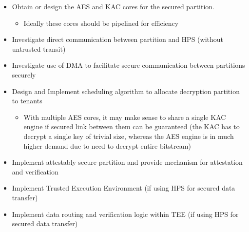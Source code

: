 \begin{itemize}
  \item Obtain or design the AES and KAC cores for the secured partition.
    \begin{itemize}  
      \item Ideally these cores should be pipelined for efficiency
    \end{itemize}
  \item Investigate direct communication between partition and HPS (without untrusted transit)
  \item Investigate use of DMA to facilitate secure communication between partitions securely
  \item Design and Implement scheduling algorithm to allocate decryption partition to tenants
    \begin{itemize}
      \item With multiple AES cores, it may make sense to share a single KAC engine if secured link between them can be guaranteed (the KAC has to decrypt a single key of trivial size, whereas the AES engine is in much higher demand due to need to decrypt entire bitstream)
    \end{itemize}
  \item Implement attestably secure partition and provide mechanism for attestation and verification
  \item Implement Trusted Execution Environment (if using HPS for secured data transfer)
  \item Implement data routing and verification logic within TEE (if using HPS for secured data transfer)
  \end{itemize}